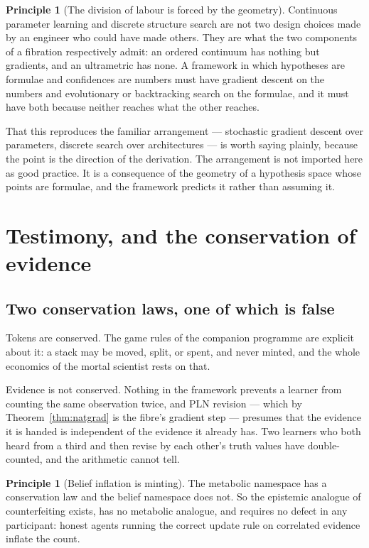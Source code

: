 \documentclass[11pt,a4paper]{article}
\theoremstyle{plain}
\theoremstyle{definition}
\newtheorem{principle}[theorem]{Principle}
\theoremstyle{remark}
\begin{document}
\begin{principle}[The division of labour is forced by the geometry]
\label{prin:division}
Continuous parameter learning and discrete structure search are not two design
choices made by an engineer who could have made others. They are what the two
components of a fibration respectively admit: an ordered continuum has nothing
but gradients, and an ultrametric has none. A framework in which hypotheses are
formulae and confidences are numbers must have gradient descent on the numbers
and evolutionary or backtracking search on the formulae, and it must have both
because neither reaches what the other reaches.
\end{principle}

That this reproduces the familiar arrangement --- stochastic gradient descent
over parameters, discrete search over architectures --- is worth saying plainly,
because the point is the direction of the derivation. The arrangement is not
imported here as good practice. It is a consequence of the geometry of a
hypothesis space whose points are formulae, and the framework predicts it rather
than assuming it.

\section{Testimony, and the conservation of evidence}\label{sec:testimony}

\subsection{Two conservation laws, one of which is false}

Tokens are conserved. The game rules of the companion programme are explicit
about it: a stack may be moved, split, or spent, and never minted, and the whole
economics of the mortal scientist rests on that.

Evidence is not conserved. Nothing in the framework prevents a learner from
counting the same observation twice, and PLN revision --- which by
Theorem~\ref{thm:natgrad} is the fibre's gradient step --- presumes that the
evidence it is handed is independent of the evidence it already has. Two learners
who both heard from a third and then revise by each other's truth values have
double-counted, and the arithmetic cannot tell.

\begin{principle}[Belief inflation is minting]\label{prin:minting}
The metabolic namespace has a conservation law and the belief namespace does not.
So the epistemic analogue of counterfeiting exists, has no metabolic analogue,
and requires no defect in any participant: honest agents running the correct
update rule on correlated evidence inflate the count.
\end{principle}
\end{document}
